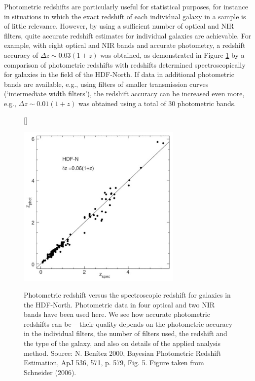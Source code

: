 \documentclass[a4paper,11pt]{article}
\begin{document}
{\noindent}Photometric redshifts are particularly useful for statistical purposes, for instance in situations in which the exact redshift of each individual galaxy in a sample is of little relevance. However, by using a sufficient number of optical and NIR filters, quite accurate redshift estimates for individual galaxies are achievable. For example, with eight optical and NIR bands and accurate photometry, a redshift accuracy of  $\Delta z\sim0.03(1+z)$ was obtained, as demonstrated in Figure \ref{fig:photvsspecredshift} by a comparison of photometric redshifts with redshifts determined spectroscopically for galaxies in the field of the HDF-North. If data in additional photometric bands are available, e.g., using filters of smaller transmission curves (`intermediate width filters'), the redshift accuracy can be increased even more, e.g., $\Delta z\sim0.01(1+z)$ was obtained using a total of 30 photometric bands.

\begin{figure}[t]
    [\FBwidth]
    {\caption{\footnotesize{Photometric redshift versus the spectroscopic redshift for galaxies in the HDF-North. Photometric data in four optical and two NIR bands have been used here. We see how accurate photometric redshifts can be -- their quality depends on the photometric accuracy in the individual filters, the number of filters used, the redshift and the type of the galaxy, and also on details of the applied analysis method. Source: N. Benítez 2000, Bayesian Photometric Redshift Estimation, ApJ 536, 571, p. 579, Fig. 5. Figure taken from Schneider (2006).}}
    \label{fig:photvsspecredshift}}
    {\includegraphics[width=8cm]{figures/PhotVsSpecRedshift.png}}
\end{figure}
\end{document}
